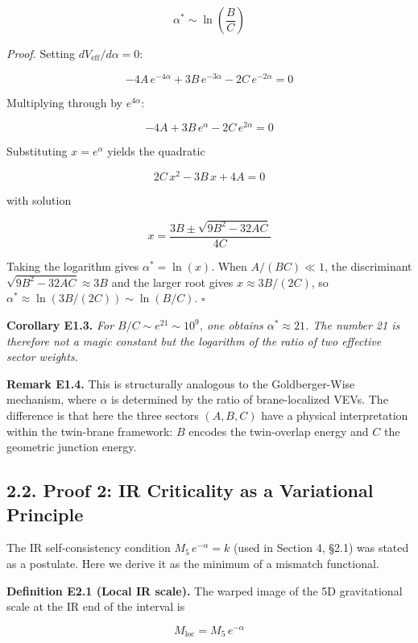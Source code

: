 \documentclass[
  11pt,
]{article}
\begin{document}
\[\alpha^* \sim \ln\!\left(\frac{B}{C}\right) \tag{60}\]

\emph{Proof.} Setting \(dV_{\text{eff}}/d\alpha = 0\):

\[-4A\,e^{-4\alpha} + 3B\,e^{-3\alpha} - 2C\,e^{-2\alpha} = 0 \tag{61}\]

Multiplying through by \(e^{4\alpha}\):

\[-4A + 3B\,e^{\alpha} - 2C\,e^{2\alpha} = 0 \tag{62}\]

Substituting \(x = e^{\alpha}\) yields the quadratic

\[2C\,x^2 - 3B\,x + 4A = 0 \tag{63}\]

with solution

\[x = \frac{3B \pm \sqrt{9B^2 - 32AC}}{4C} \tag{64}\]

Taking the logarithm gives \(\alpha^* = \ln(x)\). When \(A/(BC) \ll 1\),
the discriminant \(\sqrt{9B^2 - 32AC} \approx 3B\) and the larger root
gives \(x \approx 3B/(2C)\), so
\(\alpha^* \approx \ln(3B/(2C)) \sim \ln(B/C)\). \(\square\)

\textbf{Corollary E1.3.} \emph{For \(B/C \sim e^{21} \sim 10^9\), one
obtains \(\alpha^* \approx 21\). The number 21 is therefore not a magic
constant but the logarithm of the ratio of two effective sector
weights.}

\textbf{Remark E1.4.} This is structurally analogous to the
Goldberger-Wise mechanism, where \(\alpha\) is determined by the ratio
of brane-localized VEVs. The difference is that here the three sectors
\((A, B, C)\) have a physical interpretation within the twin-brane
framework: \(B\) encodes the twin-overlap energy and \(C\) the geometric
junction energy.

\bigskip

\hypertarget{proof-2-ir-criticality-as-a-variational-principle}{%
\subsection{2.2. Proof 2: IR Criticality as a Variational
Principle}\label{proof-2-ir-criticality-as-a-variational-principle}}

The IR self-consistency condition \(M_5\,e^{-\alpha} = k\) (used in
Section 4, §2.1) was stated as a postulate. Here we derive it as the
minimum of a mismatch functional.

\textbf{Definition E2.1 (Local IR scale).} The warped image of the 5D
gravitational scale at the IR end of the interval is

\[M_{\text{loc}} = M_5\,e^{-\alpha} \tag{65}\]
\end{document}
